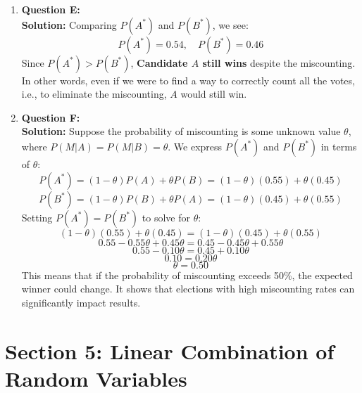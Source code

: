 \documentclass{article}
\begin{document}
\begin{enumerate}
    \item \textbf{Question E:} \\
    \textbf{Solution:} Comparing \( P(A^*) \) and \( P(B^*) \), we see:
    \[
    P(A^*) = 0.54, \quad P(B^*) = 0.46
    \]
    Since \( P(A^*) > P(B^*) \), \textbf{Candidate \( A \) still wins} despite the miscounting.  In other words, even if we were to find a way to correctly count all the votes, i.e., to eliminate the miscounting, $A$ would still win.

    \item \textbf{Question F:} \\
    \textbf{Solution:} Suppose the probability of miscounting is some unknown value \( \theta \), where \( P(M | A) = P(M | B) = \theta \). We express \( P(A^*) \) and \( P(B^*) \) in terms of \( \theta \):
    \[
    P(A^*) = (1 - \theta) P(A) + \theta P(B) = (1 - \theta) (0.55) + \theta (0.45)
    \]
    \[
    P(B^*) = (1 - \theta) P(B) + \theta P(A) = (1 - \theta) (0.45) + \theta (0.55)
    \]
    Setting \( P(A^*) = P(B^*) \) to solve for \( \theta \):
    \[
    (1 - \theta) (0.55) + \theta (0.45) = (1 - \theta) (0.45) + \theta (0.55)
    \]
    \[
    0.55 - 0.55\theta + 0.45\theta = 0.45 - 0.45\theta + 0.55\theta
    \]
    \[
    0.55 - 0.10\theta = 0.45 + 0.10\theta
    \]
    \[
    0.10 = 0.20\theta
    \]
    \[
    \theta = 0.50
    \]
    This means that if the probability of miscounting exceeds 50\%, the expected winner could change. It shows that elections with high miscounting rates can significantly impact results.

\end{enumerate}

\section*{Section 5: Linear Combination of Random Variables}
\end{document}
